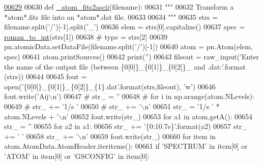 \begin{DoxyCode}
\hypertarget{namespacepyneb_1_1utils_1_1manage__atomic__data_l00629}{}\hyperlink{namespacepyneb_1_1utils_1_1manage__atomic__data_a98c41f7a8ffa3a9e23d64909eba559e1}{00629} 
00630 \textcolor{keyword}{def }\hyperlink{namespacepyneb_1_1utils_1_1manage__atomic__data_a98c41f7a8ffa3a9e23d64909eba559e1}{\_atom\_fits2ascii}(filename):
00631     \textcolor{stringliteral}{"""}
00632 \textcolor{stringliteral}{    Transform a *atom*.fits file into an *atom*.dat file.}
00633 \textcolor{stringliteral}{    }
00634 \textcolor{stringliteral}{    """}
00635     strs = filename.split(\textcolor{stringliteral}{'/'})[-1].split(\textcolor{stringliteral}{'\_'})
00636     elem = strs[0].capitalize()
00637     spec = \hyperlink{namespacepyneb_1_1utils_1_1misc_ae67dbd6bb48d64216bc162ebdc25a183}{roman\_to\_int}(strs[1])
00638 \textcolor{comment}{#    type = strs[2]}
00639     pn.atomicData.setDataFile(filename.split(\textcolor{stringliteral}{'/'})[-1])
00640     atom = pn.Atom(elem, spec)
00641     atom.printSources()
00642     print(\textcolor{stringliteral}{''})
00643     fileout = raw\_input(\textcolor{stringliteral}{'Enter the name of the output file (between \{0[0]\}\_\{0[1]\}\_\{0[2]\}\_ and .dat:'}.format
      (strs))
00644     
00645     fout = open(\textcolor{stringliteral}{'\{0[0]\}\_\{0[1]\}\_\{0[2]\}\_\{1\}.dat'}.format(strs,fileout), \textcolor{stringliteral}{'w'})
00646     fout.write(\textcolor{stringliteral}{'Aij\(\backslash\)n'})
00647 \textcolor{comment}{#    str\_ = ''}
00648 \textcolor{comment}{#    for i in np.arange(atom.NLevels):}
00649 \textcolor{comment}{#        str\_ += '1/s '}
00650 \textcolor{comment}{#    str\_ += '\(\backslash\)n'}
00651     str\_ = \textcolor{stringliteral}{'1/s '} * atom.NLevels + \textcolor{stringliteral}{'\(\backslash\)n'}
00652     fout.write(str\_)
00653     \textcolor{keywordflow}{for} a1 \textcolor{keywordflow}{in} atom.getA():
00654         str\_ = \textcolor{stringliteral}{''}
00655         \textcolor{keywordflow}{for} a2 \textcolor{keywordflow}{in} a1:
00656             str\_ += \textcolor{stringliteral}{'\{0:10.7e\}'}.format(a2)
00657             str\_ += \textcolor{stringliteral}{' '}
00658         str\_ += \textcolor{stringliteral}{'\(\backslash\)n'}
00659         fout.write(str\_)
00660     \textcolor{keywordflow}{for} item \textcolor{keywordflow}{in} atom.AtomData.AtomHeader.iteritems():
00661         \textcolor{keywordflow}{if} \textcolor{stringliteral}{'SPECTRUM'} \textcolor{keywordflow}{in} item[0] \textcolor{keywordflow}{or} \textcolor{stringliteral}{'ATOM'} \textcolor{keywordflow}{in} item[0] \textcolor{keywordflow}{or} \textcolor{stringliteral}{'GSCONFIG'} \textcolor{keywordflow}{in} item[0]:

\end{DoxyCode}
